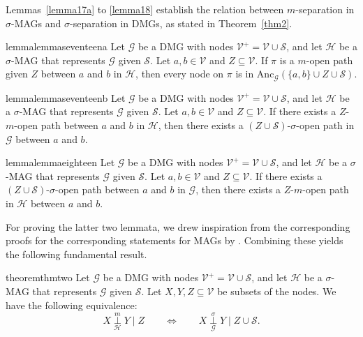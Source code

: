 \documentclass[accepted]{uai2025} %
\newcommand{\anc}{\text{Anc}}
\begin{document}
Lemmas~\ref{lemma17a} to \ref{lemma18} establish the relation between $m$-separation in $\sigma$-MAGs and $\sigma$-separation in DMGs, as stated in Theorem~\ref{thm2}.

\begin{restatable}{lemma}{lemmaseventeena} \label{lemma17a}
Let $\mathcal{G}$ be a DMG with nodes $\mathcal{V}^+=\mathcal{V}\cup \mathcal{S}$, and let $\mathcal{H}$ be a $\sigma$-MAG that represents $\mathcal{G}$ given $\mathcal{S}$. Let $a,b\in  \mathcal{V}$ and $Z\subseteq \mathcal{V}$. If $\pi$ is a $m$-open path given $Z$ between $a$ and $b$ in $\mathcal{H}$, then every node on $\pi$ is in $\anc_\mathcal{G}(\{a,b\}\cup Z\cup \mathcal{S})$.
\end{restatable}

\begin{restatable}{lemma}{lemmaseventeenb} \label{lemma17b}
Let $\mathcal{G}$ be a DMG with nodes $\mathcal{V}^+=\mathcal{V}\cup \mathcal{S}$, and let $\mathcal{H}$ be a $\sigma$-MAG that represents $\mathcal{G}$ given $\mathcal{S}$. Let $a,b\in  \mathcal{V}$ and $Z\subseteq  \mathcal{V}$. If there exists a $Z$-$m$-open path between $a$ and $b$ in $\mathcal{H}$, then there exists a $(Z\cup \mathcal{S})$-$\sigma$-open path in $\mathcal{G}$ between $a$ and $b$.
\end{restatable}

\begin{restatable}{lemma}{lemmaeighteen} \label{lemma18}
Let $\mathcal{G}$ be a DMG with nodes $\mathcal{V}^+=\mathcal{V}\cup \mathcal{S}$, and let $\mathcal{H}$ be a $\sigma$-MAG that represents $\mathcal{G}$ given $\mathcal{S}$. Let $a,b\in \mathcal{V}$ and $Z\subseteq \mathcal{V}$. If there exists a $(Z\cup \mathcal{S})$-$\sigma$-open path between $a$ and $b$ in $\mathcal{G}$, then there exists a $Z$-$m$-open path in $\mathcal{H}$ between $a$ and $b$.
\end{restatable}

For proving the latter two lemmata, we drew inspiration from the corresponding proofs for the corresponding statements for MAGs by \citet[Lemma 17--18]{spirtes1996polynomial}.
Combining these yields the following fundamental result.

\begin{restatable}{theorem}{thmtwo} \label{thm2}
Let $\mathcal{G}$ be a DMG with nodes $\mathcal{V}^+=\mathcal{V}\cup \mathcal{S}$, and let $\mathcal{H}$ be a $\sigma$-MAG that represents $\mathcal{G}$ given $\mathcal{S}$. Let $X,Y,Z\subseteq  \mathcal{V}$ be subsets of the nodes. We have the following equivalence:
$$
X\overset{m}{\underset{\mathcal{H}}{\perp}} Y\mid Z\qquad\iff\qquad X\overset{\sigma}{\underset{\mathcal{G}}{\perp}} Y\mid Z\cup \mathcal{S}.
$$
\end{restatable}
\end{document}
